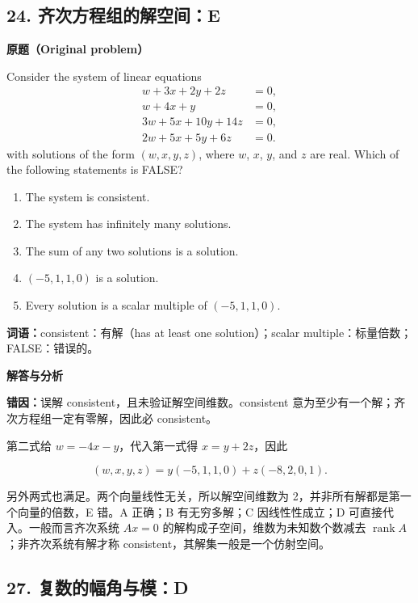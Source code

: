 \documentclass[11pt,a4paper,fontset=fandol]{ctexart}
\begin{document}
\hypertarget{ux9f50ux6b21ux65b9ux7a0bux7ec4ux7684ux89e3ux7a7aux95f4e}{%
\subsection{24.
齐次方程组的解空间：E}\label{ux9f50ux6b21ux65b9ux7a0bux7ec4ux7684ux89e3ux7a7aux95f4e}}

\textbf{原题（Original problem）}\par
Consider the system of linear equations
\[\begin{aligned}w+3x+2y+2z&=0,\\ w+4x+y&=0,\\ 3w+5x+10y+14z&=0,\\ 2w+5x+5y+6z&=0.\end{aligned}\]
with solutions of the form $(w,x,y,z)$, where $w$, $x$, $y$, and $z$ are real. Which of the following statements is FALSE?
\begin{enumerate}[label=(\Alph*)]
\item The system is consistent. \item The system has infinitely many solutions. \item The sum of any two solutions is a solution. \item $(-5,1,1,0)$ is a solution. \item Every solution is a scalar multiple of $(-5,1,1,0)$.
\end{enumerate}
\textbf{词语：}consistent：有解（has at least one solution）；scalar multiple：标量倍数；FALSE：错误的。

\textbf{解答与分析}\par


\textbf{错因：}误解 consistent，且未验证解空间维数。consistent
意为至少有一个解；齐次方程组一定有零解，因此必 consistent。

第二式给 \(w=-4x-y\)，代入第一式得 \(x=y+2z\)，因此

\[ (w,x,y,z)=y(-5,1,1,0)+z(-8,2,0,1). \]

另外两式也满足。两个向量线性无关，所以解空间维数为
2，并非所有解都是第一个向量的倍数，E 错。A 正确；B 有无穷多解；C
因线性性成立；D 可直接代入。一般而言齐次系统 \(Ax=0\)
的解构成子空间，维数为未知数个数减去
\(\operatorname{rank}A\)；非齐次系统有解才称
consistent，其解集一般是一个仿射空间。

\hypertarget{ux590dux6570ux7684ux5e45ux89d2ux4e0eux6a21d}{%
\subsection{27.
复数的幅角与模：D}\label{ux590dux6570ux7684ux5e45ux89d2ux4e0eux6a21d}}
\end{document}
